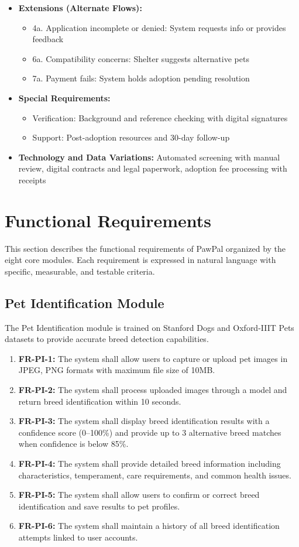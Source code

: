\begin{itemize}
    \item \textbf{Extensions (Alternate Flows):}
    \begin{itemize}
        \item 4a. Application incomplete or denied: System requests info or provides feedback
        \item 6a. Compatibility concerns: Shelter suggests alternative pets
        \item 7a. Payment fails: System holds adoption pending resolution
    \end{itemize}
    \item \textbf{Special Requirements:}
    \begin{itemize}
        \item Verification: Background and reference checking with digital signatures
        \item Support: Post-adoption resources and 30-day follow-up
    \end{itemize}
    \item \textbf{Technology and Data Variations:} Automated screening with manual review, digital contracts and legal paperwork, adoption fee processing with receipts
\end{itemize}

\section{Functional Requirements}
This section describes the functional requirements of PawPal organized by the eight core modules. Each requirement is expressed in natural language with specific, measurable, and testable criteria.

\subsection{Pet Identification Module}
The Pet Identification module is trained on Stanford Dogs and Oxford-IIIT Pets datasets to provide accurate breed detection capabilities.
\begin{enumerate}
    \item \textbf{FR-PI-1:} The system shall allow users to capture or upload pet images in JPEG, PNG formats with maximum file size of 10MB.
    \item \textbf{FR-PI-2:} The system shall process uploaded images through a model and return breed identification within 10 seconds.
    \item \textbf{FR-PI-3:} The system shall display breed identification results with a confidence score (0--100\%) and provide up to 3 alternative breed matches when confidence is below 85\%.
    \item \textbf{FR-PI-4:} The system shall provide detailed breed information including characteristics, temperament, care requirements, and common health issues.
    \item \textbf{FR-PI-5:} The system shall allow users to confirm or correct breed identification and save results to pet profiles.
    \item \textbf{FR-PI-6:} The system shall maintain a history of all breed identification attempts linked to user accounts.
\end{enumerate}

